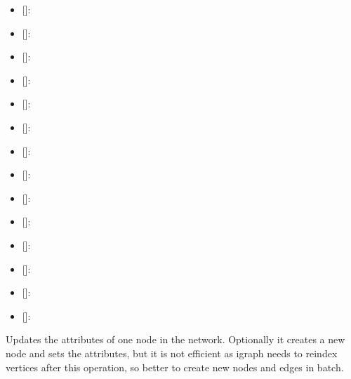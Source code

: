 \documentclass[letterpaper,10pt,english]{sphinxmanual}
\begin{document}
\begin{fulllineitems}
\begin{itemize}
\begin{description}
\begin{itemize}
\item {} 
 {[}{]}:

\item {} 
 {[}{]}:

\item {} 
 {[}{]}:

\item {} 
 {[}{]}:

\item {} 
 {[}{]}:

\item {} 
 {[}{]}:

\item {} 
 {[}{]}:

\item {} 
 {[}{]}:

\item {} 
 {[}{]}:

\item {} 
 {[}{]}:

\item {} 
 {[}{]}:

\item {} 
 {[}{]}:

\item {} 
 {[}{]}:

\item {} 
 {[}{]}:

\end{itemize}

\end{description}

\end{itemize}

\begin{fulllineitems}
\label{\detokenize{main:pypath.main.PyPath.add_update_vertex}}
Updates the attributes of one node in the network.
Optionally it creates a new node and sets the attributes,
but it is not efficient as igraph needs to reindex vertices
after this operation, so better to create new nodes and
edges in batch.


\end{fulllineitems}
\end{fulllineitems}
\end{document}
